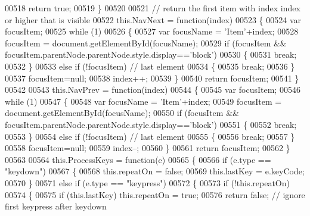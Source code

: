 \begin{DoxyCode}
00518       \textcolor{keywordflow}{return} \textcolor{keyword}{true};
00519     \}
00520 
00521     \textcolor{comment}{// return the first item with index index or higher that is visible}
00522     this.NavNext = \textcolor{keyword}{function}(index)
00523     \{
00524       var focusItem;
00525       \textcolor{keywordflow}{while} (1)
00526       \{
00527         var focusName = \textcolor{stringliteral}{'Item'}+index;
00528         focusItem = document.getElementById(focusName);
00529         \textcolor{keywordflow}{if} (focusItem && focusItem.parentNode.parentNode.style.display==\textcolor{stringliteral}{'block'})
00530         \{
00531           \textcolor{keywordflow}{break};
00532         \}
00533         \textcolor{keywordflow}{else} \textcolor{keywordflow}{if} (!focusItem) \textcolor{comment}{// last element}
00534         \{
00535           \textcolor{keywordflow}{break};
00536         \}
00537         focusItem=null;
00538         index++;
00539       \}
00540       \textcolor{keywordflow}{return} focusItem;
00541     \}
00542 
00543     this.NavPrev = \textcolor{keyword}{function}(index)
00544     \{
00545       var focusItem;
00546       \textcolor{keywordflow}{while} (1)
00547       \{
00548         var focusName = \textcolor{stringliteral}{'Item'}+index;
00549         focusItem = document.getElementById(focusName);
00550         \textcolor{keywordflow}{if} (focusItem && focusItem.parentNode.parentNode.style.display==\textcolor{stringliteral}{'block'})
00551         \{
00552           \textcolor{keywordflow}{break};
00553         \}
00554         \textcolor{keywordflow}{else} \textcolor{keywordflow}{if} (!focusItem) \textcolor{comment}{// last element}
00555         \{
00556           \textcolor{keywordflow}{break};
00557         \}
00558         focusItem=null;
00559         index--;
00560       \}
00561       \textcolor{keywordflow}{return} focusItem;
00562     \}
00563 
00564     this.ProcessKeys = \textcolor{keyword}{function}(e)
00565     \{
00566       \textcolor{keywordflow}{if} (e.type == \textcolor{stringliteral}{"keydown"})
00567       \{
00568         this.repeatOn = \textcolor{keyword}{false};
00569         this.lastKey = e.keyCode;
00570       \}
00571       \textcolor{keywordflow}{else} \textcolor{keywordflow}{if} (e.type == \textcolor{stringliteral}{"keypress"})
00572       \{
00573         \textcolor{keywordflow}{if} (!this.repeatOn)
00574         \{
00575           \textcolor{keywordflow}{if} (this.lastKey) this.repeatOn = \textcolor{keyword}{true};
00576           \textcolor{keywordflow}{return} \textcolor{keyword}{false}; \textcolor{comment}{// ignore first keypress after keydown}

\end{DoxyCode}
